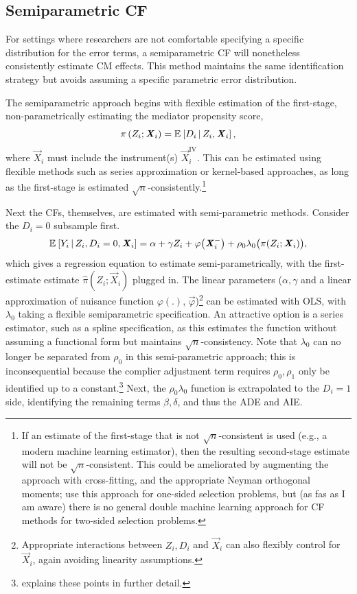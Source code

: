 \subsection{Semiparametric CF}
For settings where researchers are not comfortable specifying a specific distribution for the error terms, a semiparametric CF will nonetheless consistently estimate CM effects.
This method maintains the same identification strategy but avoids assuming a specific parametric error distribution.

The semiparametric approach begins with flexible estimation of the first-stage, non-parametrically estimating the mediator propensity score,
\[ \pi\left(Z_i; \boldsymbol{\mathit{X}}_i \right) = \mathbb{E}_{} \left[ D_i \, \middle\vert \, Z_i, \boldsymbol{\mathit{X}}_i \right], \]
where $\vec X_i$ must include the instrument(s) $\vec X_i^{\text{IV}}$.
This can be estimated using flexible methods such as series approximation or kernel-based approaches, as long as the first-stage is estimated $\sqrt{n}$-consistently.\footnote{
    If an estimate of the first-stage that is not $\sqrt{n}$-consistent is used (e.g., a modern machine learning estimator), then the resulting second-stage estimate will not be $\sqrt{n}$-consistent.
    This could be ameliorated by augmenting the approach with cross-fitting, and the appropriate Neyman orthogonal moments; \cite{bia2024double} use this approach for one-sided selection problems, but (as fas as I am aware) there is no general double machine learning approach for CF methods for two-sided selection problems.  
}

Next the CFs, themselves, are estimated with semi-parametric methods.
Consider the $D_i = 0$ subsample first.
\[ \mathbb{E}_{} \left[ Y_i \, \middle\vert \, Z_i, D_i = 0, \boldsymbol{\mathit{X}}_i \right] =
    \alpha + \gamma Z_i + \varphi\big( \boldsymbol{\mathit{X}}_i^- \big)
    +  \rho_0 \lambda_0 \big( \pi(Z_i ; \boldsymbol{\mathit{X}}_i) \big), \]
which gives a regression equation to estimate semi-parametrically, with the first-estimate estimate $\hat\pi\left(Z_i; \vec X_i \right)$ plugged in.
The linear parameters ($\alpha, \gamma$ and a linear approximation of nuisance function $\varphi(.)$, $\vec \varphi$)\footnote{
    Appropriate interactions between $Z_i, D_i$ and $\vec X_i$ can also flexibly control for $\vec X_i$, again avoiding linearity assumptions.
} can be estimated with OLS, with $\lambda_0$ taking a flexible semiparametric specification.
An attractive option is a series estimator, such as a spline specification, as this estimates the function without assuming a functional form but maintains $\sqrt n$-consistency.
Note that $\lambda_0$ can no longer be separated from $\rho_0$ in this semi-parametric approach; this is inconsequential because the complier adjustment term requires $\rho_0, \rho_1$ only be identified up to a constant.\footnote{
     explains these points in further detail.
}
Next, the $\rho_0 \lambda_0$ function is extrapolated to the $D_i = 1$ side, identifying the remaining terms $\beta, \delta$, and thus the ADE and AIE.

